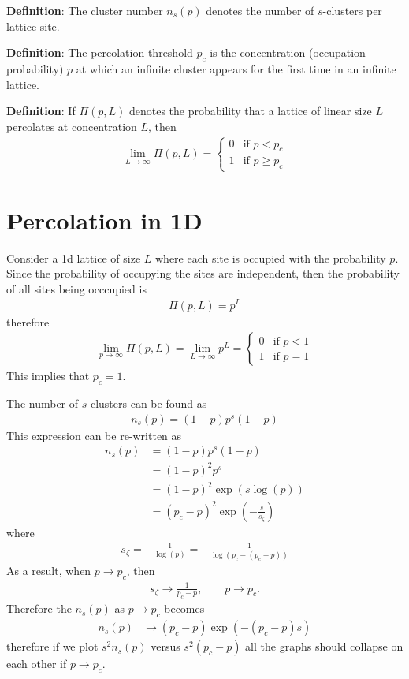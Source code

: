 \textbf{Definition}: The cluster number $n_s(p)$ denotes the number of
$s$-clusters per lattice site.

\textbf{Definition}: The percolation threshold $p_c$ is the
concentration (occupation probability) $p$ at which an infinite
cluster appears for the first time in an infinite lattice.

\textbf{Definition}: If $\Pi(p,L)$ denotes the probability that a
lattice of linear size $L$ percolates at concentration $L$, then
%
\begin{align}
  \lim_{L\to \infty}\Pi (p, L) =
  \begin{cases}
    0 & \text{if } p<p_c \\
    1 & \text{if } p\geq p_c
  \end{cases}
\end{align}
%


\section{Percolation in 1D}

Consider a 1d lattice of size $L$ where each site is occupied with the
probability $p$. Since the probability of occupying the sites are
independent, then the probability of all sites being occcupied is 
%
\begin{align}
  \Pi (p, L) = p^L
\end{align}
%
therefore
%
\begin{align}
  \lim_{p\to \infty} \Pi (p,L) = \lim_{L\to \infty} p^L  =
  \begin{cases}
    0 & \text{if } p <1 \\
    1 & \text{if } p =1
  \end{cases}
\end{align}
%
This implies that $p_c = 1$. 


The number of $s$-clusters can be found as
%
\begin{align}
  n_s(p) = (1-p) p^s (1-p)
\end{align}
%
This expression can be re-written as 
%
\begin{align}
  n_s(p) & = (1-p) p^s (1-p) \\
         & = (1-p)^{2} p^s  \\
         & = (1-p)^{2} \exp(s \log (p) ) \\
         & = (p_c-p)^{2} \exp(-\frac{s}{s_{\zeta}})
\end{align}
%
where
%
\begin{align}
  s_{\zeta}  = - \frac{1}{\log(p)}  = -\frac{1}{\log(p_c - (p_c - p) )} 
\end{align}
%
As a result, when $p\to p_c$, then
%
\begin{align}
  s_{\zeta } \to \frac{1}{p_{c}-p}, \qquad p \to p_c. 
\end{align}
%
Therefore the $n_s(p)$ as $p\to p_c$ becomes
%
\begin{align}
  n_s(p) & \to (p_c-p) \exp( - (p_c-p) s) 
\end{align}
%
therefore if we plot $s^2 n_s (p) $ versus $s^2 (p_c-p)$ all the
graphs should collapse on each other if $p \to p_c$. 



